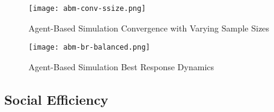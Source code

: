 \begin{figure}[ht] 
    \centering
    \caption{Agent-Based Simulation Convergence with Varying Sample Sizes}
    \texttt{[image: abm-conv-ssize.png]}
    \label{fig:abm-conv-ssize}
\end{figure} 


\begin{figure}[ht] 
    \centering
    \caption{Agent-Based Simulation Best Response Dynamics}
    \texttt{[image: abm-br-balanced.png]}
    \label{fig:abm-br-balanced}
\end{figure} 
\subsection{Social Efficiency}


